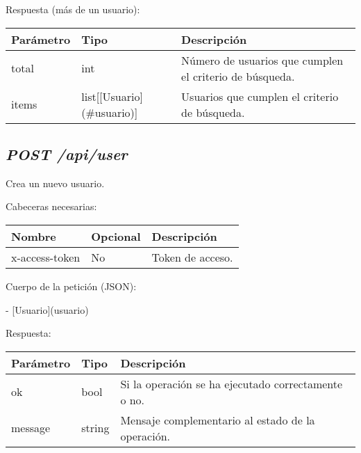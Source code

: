 Respuesta (más de un usuario):
\begin{table}[h!]
	\centering
	\begin{adjustbox}{max width=\textwidth}
	\begin{tabular}{|l|l|l|}
		\hline
		Parámetro & Tipo & Descripción \\ \hline
		total & int & Número de usuarios que cumplen el criterio de búsqueda. \\ \hline
		items & list[[Usuario](\#usuario)] & Usuarios que cumplen el criterio de búsqueda. \\ \hline
	\end{tabular}
\end{adjustbox}
\end{table}


\subsection{\textit{POST /api/user}}
Crea un nuevo usuario.

Cabeceras necesarias:
\begin{table}[h!]
	\centering
	\begin{adjustbox}{max width=\textwidth}
	\begin{tabular}{|l|l|l|}
		\hline
		Nombre & Opcional & Descripción \\ \hline
		x-access-token & No & Token de acceso. \\ \hline
	\end{tabular}
\end{adjustbox}
\end{table}

Cuerpo de la petición (JSON):

- [Usuario](usuario)

Respuesta:
\begin{table}[!h]
	\centering
	\begin{adjustbox}{max width=\textwidth}
	\begin{tabular}{|l|l|l|}
		\hline
		Parámetro & Tipo & Descripción \\ \hline
		ok & bool & Si la operación se ha ejecutado correctamente o no. \\ \hline
		message & string & Mensaje complementario al estado de la operación. \\ \hline
	\end{tabular}
\end{adjustbox}
\end{table}




